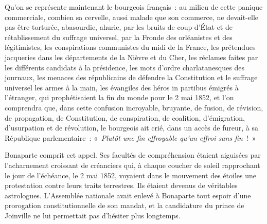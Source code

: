 \documentclass[french,twoside]{book} %
\begin{document}
\noindent Qu’on se représente maintenant le bourgeois français : au milieu de cette panique commerciale, combien sa cervelle, aussi malade que son commerce, ne devait-elle pas être torturée, abasourdie, ahurie, par les bruits de coup d’État et de rétablissement du suffrage universel, par la Fronde des orléanistes et des légitimistes, les conspirations communistes du midi de la France, les prétendues jacqueries dans les départements de la Nièvre et du Cher, les réclames faites par les différents candidats à la présidence, les mots d’ordre charlatanesques des journaux, les menaces des républicains de défendre la Constitution et le suffrage universel les armes à la main, les évangiles des héros in partibus émigrés à l’étranger, qui prophétisaient la fin du monde pour le 2 mai 1852, et l’on comprendra que, dans cette confusion incroyable, bruyante, de fusion, de révision, de propagation, de Constitution, de conspiration, de coalition, d’émigration, d’usurpation et de révolution, le bourgeois ait crié, dans un accès de fureur, à sa République parlementaire : « \emph{Plutôt une fin effroyable qu’un effroi sans fin} ! »\par
Bonaparte comprit cet appel. Ses facultés de compréhension étaient aiguisées par l’acharnement croissant de créanciers qui, à chaque coucher de soleil rapprochant le jour de l’échéance, le 2 mai 1852, voyaient dans le mouvement des étoiles une protestation contre leurs traits terrestres. Ils étaient devenus de véritables astrologues. L’Assemblée nationale avait enlevé à Bonaparte tout espoir d’une prorogation constitutionnelle de son mandat, et la candidature du prince de Joinville ne lui permettait pas d’hésiter plus longtemps.\par
\end{document}
